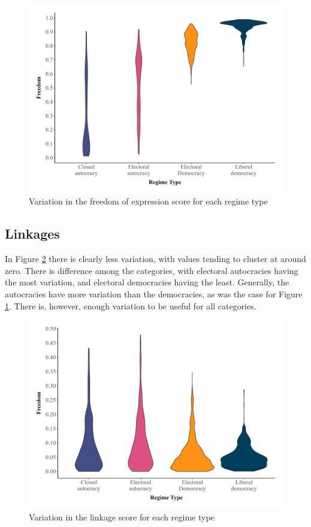 \begin{figure}[H]
    \centering
    \includegraphics[width=\linewidth]{graphics/variation_freedom.jpeg}
    \caption{Variation in the freedom of expression score for each regime type}
    \label{fig:variation_freedom}
\end{figure}

\subsection{Linkages}
In Figure \ref{fig:variation_fbic} there is clearly less variation, with values tending to cluster at around zero. There is difference among the categories, with electoral autocracies having the most variation, and electoral democracies having the least. Generally, the autocracies have more variation than the democracies, as was the case for Figure \ref{fig:variation_freedom}. There is, however, enough variation to be useful for all categories. 

\begin{figure}[H]
    \centering
    \includegraphics[width=\linewidth]{graphics/variation_fbic.jpeg}
    \caption{Variation in the linkage score for each regime type}
    \label{fig:variation_fbic}
\end{figure}

